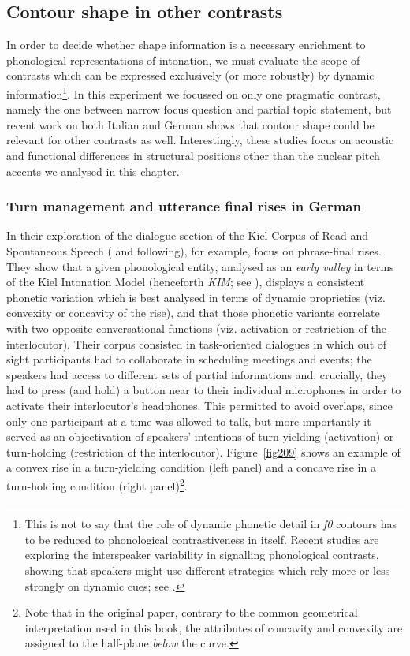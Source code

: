 \subsection{Contour shape in other contrasts}\label{sec241}
In order to decide whether shape information is a necessary enrichment to phonological representations of intonation, we must evaluate the scope of contrasts which can be expressed exclusively (or more robustly) by dynamic information\footnote{This is not to say that the role of dynamic phonetic detail in \textit{f0} contours has to be reduced to phonological contrastiveness in itself. Recent studies are exploring the interspeaker variability in signalling phonological contrasts, showing that speakers might use different strategies which rely more or less strongly on dynamic cues; see \citet{niebuhr2011shapers}.}. In this experiment we focussed on only one pragmatic contrast, namely the one between narrow focus question and partial topic statement, but recent work on both Italian \citep{dimperio2000role,petrone2008tonal} and German \citep{dombrowski2005acoustic,petrone2014intonation} shows that contour shape could be relevant for other contrasts as well. Interestingly, these studies focus on acoustic and functional differences in structural positions other than the nuclear pitch accents we analysed in this chapter.

\subsubsection{Turn management and utterance final rises in German}\label{sec2411}
In their exploration of the dialogue section of the Kiel Corpus of Read and Spontaneous Speech (\citealt{ipds1994kcrs} and following), for example, \citeauthor{dombrowski2005acoustic} focus on phrase-final rises. They show that a given phonological entity, analysed as an \textit{early valley} in terms of the Kiel Intonation Model (henceforth \textit{KIM}; see \citealt{kohler1991model}), displays a consistent phonetic variation which is best analysed in terms of dynamic proprieties (viz. convexity or concavity of the rise), and that those phonetic variants correlate with two opposite conversational functions (viz. activation or restriction of the interlocutor). Their corpus consisted in task-oriented dialogues in which out of sight participants had to collaborate in scheduling meetings and events; the speakers had access to different sets of partial informations and, crucially, they had to press (and hold) a button near to their individual microphones in order to activate their interlocutor's headphones. This permitted to avoid overlaps, since only one participant at a time was allowed to talk, but more importantly it served as an objectivation of speakers' intentions of turn-yielding (activation) or turn-holding (restriction of the interlocutor). Figure~\ref{fig209} shows an example of a convex rise in a turn-yielding condition (left panel) and a concave rise in a turn-holding condition (right panel)\footnote{Note that in the original paper, contrary to the common geometrical interpretation used in this book, the attributes of concavity and convexity are assigned to the half-plane \textit{below} the curve.}. 

